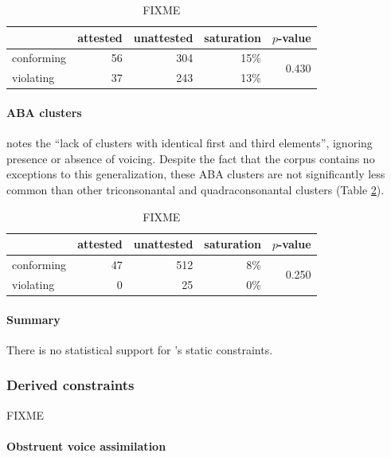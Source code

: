 \begin{table}
\centering
\begin{tabular}{l rrrr}
\toprule
           & attested & unattested & saturation & $p$-value \\
\midrule
conforming & 56       & 304        & 15\%       & \multirow{2}{*}{0.430} \\
violating  & 37       & 243        & 13\%       \\
\bottomrule
\end{tabular}
\caption{FIXME}
\label{cctab}
\end{table}

\noindent

\paragraph{ABA clusters} \citet[][176]{Pierrehumbert1994} notes the ``lack of clusters with identical first and third elements'', ignoring presence or absence of voicing. Despite the fact that the corpus contains no exceptions to this generalization, these \textsc{ABA} clusters are not significantly less common than other triconsonantal and quadraconsonantal clusters (Table \ref{abatab}).

\begin{table}
\centering
\begin{tabular}{l rrrr}
\toprule
           & attested & unattested & saturation & $p$-value \\
\midrule
conforming & 47       & 512        &  8\%       & \multirow{2}{*}{0.250} \\
violating  &  0       &  25        &  0\%       \\
\bottomrule
\end{tabular}
\caption{FIXME}
\label{abatab}
\end{table}

\paragraph{Summary} There is no statistical support for \citeauthor{Pierrehumbert1994}'s static constraints.

\subsubsection{Derived constraints}

FIXME

\paragraph{Obstruent voice assimilation}

